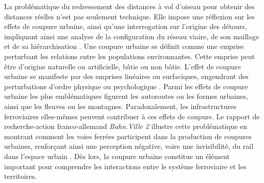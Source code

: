 \begin{refsegment}
La problématique du redressement des distances à vol d’oiseau pour obtenir des distances réelles n’est pas seulement technique. Elle impose une réflexion sur les effets de coupure urbaine, ainsi qu’une interrogation sur l’origine des détours, impliquant ainsi une analyse de la configuration du réseau viaire, de son maillage et de sa hiérarchisation \textcolor{blue}{\autocite[119]{heran_distances_2009}}. Une coupure urbaine se définit comme une emprise perturbant les relations entre les populations environnantes. Cette emprise peut être d’origine naturelle ou artificielle, bâtie ou non bâtie. L’effet de coupure urbaine se manifeste par des emprises linéaires ou surfaciques, engendrant des perturbations d’ordre physique ou psychologique \textcolor{blue}{\autocite[4]{heran_zones_2009}}. Parmi les effets de coupure urbaine les plus emblématiques figurent les autoroutes ou les formes urbaines, ainsi que les fleuves ou les montagnes. Paradoxalement, les infrastructures ferroviaires elles-mêmes peuvent contribuer à ces effets de coupure. Le rapport de recherche-action franco-allemand \textsl{Bahn.Ville 2} illustre cette problématique en montrant comment les voies ferrées participent dans la production de coupures urbaines, renforçant ainsi une \gls{perception} négative, voire une invisibilité, du rail dans l’espace urbain \textcolor{blue}{\autocite[20]{lhostis_concevoir_2009}}. Dès lors, la coupure urbaine constitue un élément important pour comprendre les interactions entre le système ferroviaire et les territoires.%


\end{refsegment}
